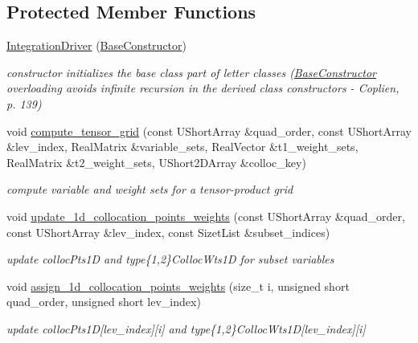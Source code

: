 \subsection*{Protected Member Functions}
\begin{DoxyCompactItemize}
\item 
\hyperlink{classPecos_1_1IntegrationDriver_a95ed45db74acb6b02ae3905336f25451}{Integration\+Driver} (\hyperlink{structPecos_1_1BaseConstructor}{Base\+Constructor})
\begin{DoxyCompactList}\small\item\em constructor initializes the base class part of letter classes (\hyperlink{structPecos_1_1BaseConstructor}{Base\+Constructor} overloading avoids infinite recursion in the derived class constructors -\/ Coplien, p. 139) \end{DoxyCompactList}\item 
void \hyperlink{classPecos_1_1IntegrationDriver_aaef7045a54c00867c500d106ab208bed}{compute\+\_\+tensor\+\_\+grid} (const U\+Short\+Array \&quad\+\_\+order, const U\+Short\+Array \&lev\+\_\+index, Real\+Matrix \&variable\+\_\+sets, Real\+Vector \&t1\+\_\+weight\+\_\+sets, Real\+Matrix \&t2\+\_\+weight\+\_\+sets, U\+Short2\+D\+Array \&colloc\+\_\+key)\label{classPecos_1_1IntegrationDriver_aaef7045a54c00867c500d106ab208bed}

\begin{DoxyCompactList}\small\item\em compute variable and weight sets for a tensor-\/product grid \end{DoxyCompactList}\item 
void \hyperlink{classPecos_1_1IntegrationDriver_a7293945cf09aa738794cd989b898162d}{update\+\_\+1d\+\_\+collocation\+\_\+points\+\_\+weights} (const U\+Short\+Array \&quad\+\_\+order, const U\+Short\+Array \&lev\+\_\+index, const Sizet\+List \&subset\+\_\+indices)\label{classPecos_1_1IntegrationDriver_a7293945cf09aa738794cd989b898162d}

\begin{DoxyCompactList}\small\item\em update colloc\+Pts1D and type\{1,2\}Colloc\+Wts1D for subset variables \end{DoxyCompactList}\item 
void \hyperlink{classPecos_1_1IntegrationDriver_a1b43b624d19b7c6370ca6e338399f6ef}{assign\+\_\+1d\+\_\+collocation\+\_\+points\+\_\+weights} (size\+\_\+t i, unsigned short quad\+\_\+order, unsigned short lev\+\_\+index)\label{classPecos_1_1IntegrationDriver_a1b43b624d19b7c6370ca6e338399f6ef}

\begin{DoxyCompactList}\small\item\em update colloc\+Pts1D\mbox{[}lev\+\_\+index\mbox{]}\mbox{[}i\mbox{]} and type\{1,2\}Colloc\+Wts1D\mbox{[}lev\+\_\+index\mbox{]}\mbox{[}i\mbox{]} \end{DoxyCompactList}\end{DoxyCompactItemize}
